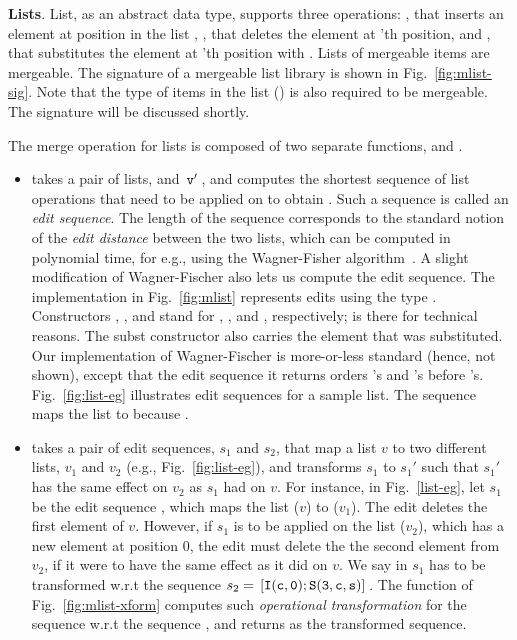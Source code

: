 

{\bf Lists}. List, as an abstract data type, supports three
operations: , that inserts an element  at
position  in the list , , that deletes the
element at 'th position, and , that substitutes
the element at 'th position with . Lists of mergeable items
are mergeable. The signature of a mergeable list library is shown in
Fig.~\ref{fig:mlist-sig}. Note that the type of items in the list
() is also required to be mergeable. The signature
 will be discussed shortly. 

The merge operation for lists is composed of two separate functions,
 and .
\begin{itemize}
  \item {} takes a pair of lists,  and $\,{\tt v'}\,$, and
  computes the shortest sequence of list operations that need to be
  applied on  to obtain . Such a sequence is called an
  \emph{edit sequence}. The length of the sequence corresponds to the
  standard notion of the \emph{edit distance} between the two lists,
  which can be computed in polynomial time, for e.g., using the
  Wagner-Fisher algorithm~\cite{wagner-fischer}. A slight modification
  of Wagner-Fischer also lets us compute the edit sequence. The
  implementation in Fig.~\ref{fig:mlist} represents edits using the
  type . Constructors , , and  stand for
  , , and , respectively;  is
  there for technical reasons. The subst constructor also carries the
   element that was substituted. Our implementation of
  Wagner-Fischer is more-or-less standard (hence, not shown), except
  that the edit sequence it returns orders 's and 's before
  's.  Fig.~\ref{fig:list-eg} illustrates edit sequences for a
  sample list. The sequence \C{[I(c,0); S(3,c,s)]} maps the list
  \C{[a;b;c]} to \C{[c;a;b;s]} because .
  \item  {} takes a pair of edit sequences, $s_1$ and
  $s_2$, that map a list $v$ to two different lists, $v_1$ and $v_2$
  (e.g., Fig.~\ref{fig:list-eg}), and transforms $s_1$ to $s_1'$ such
  that $s_1'$ has the same effect on $v_2$ as $s_1$ had on $v$.  For
  instance, in Fig.~\ref{list-eg}, let $s_1$ be the edit sequence
  \C{[D(1); S(d,1)]}, which maps the list \C{[a;b;c]} ($v$) to
  \C{[a;d]} ($v_1$). The  edit deletes the first element of $v$.
  However, if $s_1$ is to be applied on the list \C{[c;a;b;s]}
  ($v_2$), which has a new element at position 0, the  edit must
  delete the the second element from $v_2$, if it were to have the
  same effect as it did on $v$. We say  in $s_1$ has to be
  transformed w.r.t the sequence $s_2 = \,{\tt [I(c,0);S(3,c,s)]}\,$.  The
  function  of Fig.~\ref{fig:mlist-xform} computes
  such \emph{operational transformation} for the sequence 
  w.r.t the sequence , and returns  as the
  transformed sequence.  
\end{itemize}


